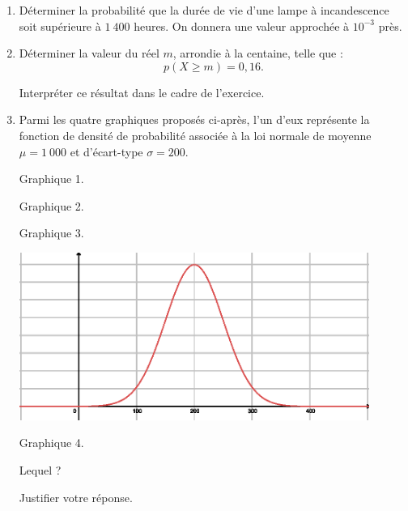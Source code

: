 \begin{enumerate}
     \item
     Déterminer la probabilité que la durée de vie d'une lampe à incandescence soit supérieure à $1\ 400$ heures. On donnera une valeur approchée à $10^{-3}$ près.
     \item
     Déterminer la valeur du réel $m$, arrondie à la centaine, telle que :
     \[ p(X \geqslant m) = 0,16. \]
     \par
     Interpréter ce résultat dans le cadre de l'exercice.
     \item
     Parmi les quatre graphiques proposés ci-après, l'un d'eux représente la fonction de densité de probabilité associée à la loi normale de moyenne $\mu =1\ 000$ et d'écart-type $\sigma = 200$.
     \par
\begin{center}
\end{center}
     \begin{center}
          Graphique 1.
     \end{center}
     \par
\begin{center}
\end{center}
     \begin{center}
          Graphique 2.
     \end{center}
\begin{center}
\end{center}
     \begin{center}
          Graphique 3.
     \end{center}
     \par
     \begin{center}
          \begin{extern}%
               \includegraphics[width=0.9\textwidth]{images/BBESL-s5-1-4}%
          \end{extern}
     \end{center}
     \begin{center}
          Graphique 4.
     \end{center}
     \par
     Lequel ?
     \par
     Justifier votre réponse.
     \par
\end{enumerate}
